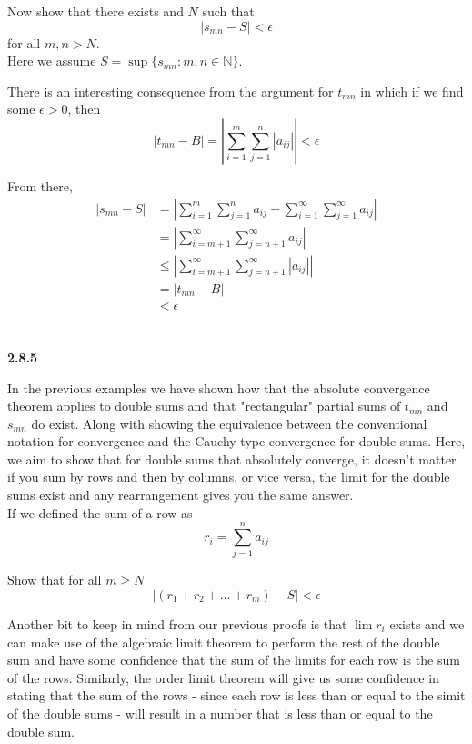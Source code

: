 Now show that there exists and $N$ such that
$$
|s_{mn} - S| < \epsilon
$$
for all $m,n > N$.
\\

Here we assume $S = \sup\{ s_{mn} : m,n\in\mathbb{N} \}$.

There is an interesting consequence from the argument for $t_{mn}$ in which if we find
some $\epsilon >0$, then
$$
|t_{mn} - B| = \left| \sum^{m}_{i=1} \sum^{n}_{j=1} |a_{ij}| \right| < \epsilon
$$

From there,
\begin{align*}
|s_{mn} - S| &= \left| \sum^{m}_{i=1} \sum^{n}_{j=1} a_{ij} - \sum^{\infty}_{i=1} \sum^{\infty}_{j=1} a_{ij}  \right| \\
&= \left| \sum^{\infty}_{i=m+1} \sum^{\infty}_{j=n+1} a_{ij} \right| \\
&\leq \left| \sum^{\infty}_{i=m+1} \sum^{\infty}_{j=n+1} |a_{ij}| \right| \\
&= |t_{mn} - B | \\
&< \epsilon
\end{align*}
\\~\\


\textbf{2.8.5}

In the previous examples we have shown how that the absolute convergence theorem applies
to double sums and that "rectangular" partial sums of $t_{mn}$ and $s_{mn}$ do exist.
Along with showing the equivalence between the conventional notation for convergence and
the Cauchy type convergence for double sums.
Here, we aim to show that for double sums that absolutely converge, it doesn't matter if you
sum by rows and then by columns, or vice versa, the limit for the double sums exist and
any rearrangement gives you the same answer.
\\

If we defined the sum of a row as
$$
r_i = \sum^{n}_{j=1} a_{ij}
$$

Show that for all $m\geq N$
$$
\left| (r_1 + r_2 + \ldots + r_m) - S \right| < \epsilon
$$

Another bit to keep in mind from our previous proofs is that $\lim r_i$ exists and we can make use of the algebraic limit theorem to
perform the rest of the double sum and have some confidence that the sum of the limits for each row is the sum of the rows.
Similarly, the order limit theorem will give us some confidence in stating that the sum of the rows - since each row is less than or equal to the simit of the double sums -
will result in a number that is less than or equal to the double sum.

